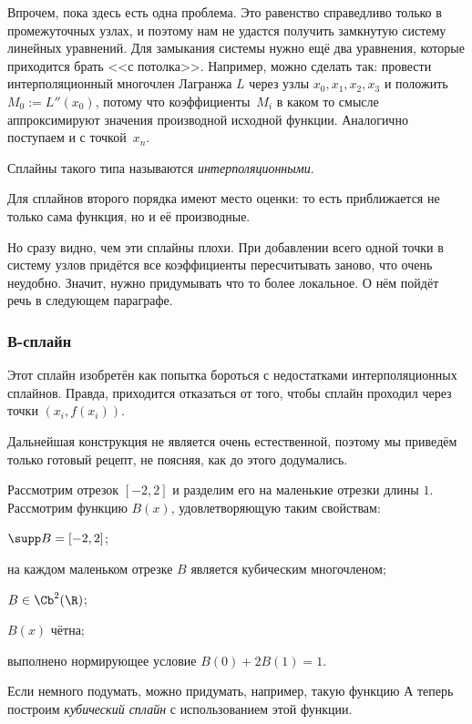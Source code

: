 \documentclass[a4paper]{article}
\begin{document}
Впрочем, пока здесь есть одна проблема. Это равенство справедливо
только в промежуточных узлах, и поэтому нам не удастся получить
замкнутую систему линейных уравнений.  Для замыкания системы нужно ещё
два уравнения, которые приходится брать <<с потолка>>.  Например,
можно сделать так: провести интерполяционный многочлен Лагранжа $L$
через узлы $x_0, x_1, x_2,x_3$ и положить $M_0 := L''(x_0)$, потому
что коэффициенты~$M_i$ в каком то смысле аппроксимируют значения
производной исходной функции.  Аналогично поступаем и с точкой~$x_n$.

\begin{df}
Сплайны такого типа называются \emph{интерполяционными}.
\end{df}

Для сплайнов второго порядка имеют место оценки:  то есть приближается не только сама функция, но и её
производные.

Но сразу видно, чем эти сплайны плохи. При добавлении всего одной
точки в систему узлов придётся все коэффициенты пересчитывать заново,
что очень неудобно.  Значит, нужно придумывать что то более
локальное. О нём пойдёт речь в следующем параграфе.

\subsubsection{В-сплайн}

Этот сплайн изобретён как попытка бороться с недостатками
интерполяционных сплайнов.  Правда, приходится отказаться от того,
чтобы сплайн проходил через точки $(x_i, f(x_i))$.

Дальнейшая конструкция не является очень естественной, поэтому мы
приведём только готовый рецепт, не поясняя, как до этого додумались.

Рассмотрим отрезок $[-2,2]$ и разделим его на маленькие отрезки длины
$1$.  Рассмотрим функцию $B(x)$, удовлетворяющую таким свойствам:
\begin{items}{-2}
\item $\supp B = [-2,2]$;
\item на каждом маленьком отрезке $B$ является кубическим многочленом;
\item $B \in \Cb^2(\R)$;
\item $B(x)$ чётна;
\item выполнено нормирующее условие $B(0) + 2B(1) = 1$.
\end{items}
Если немного подумать, можно придумать, например, такую функцию
А теперь построим \emph{кубический сплайн} с использованием этой
функции.
\end{document}
